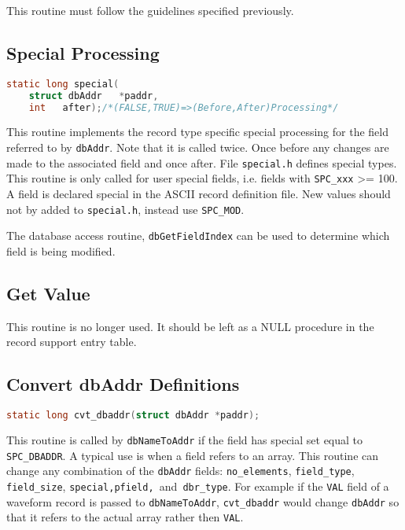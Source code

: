 This routine must follow the guidelines specified previously.

\subsection{Special Processing}

\begin{lstlisting}[language=C]
static long special(
    struct dbAddr   *paddr,
    int   after);/*(FALSE,TRUE)=>(Before,After)Processing*/
\end{lstlisting}

This routine implements the record type specific special processing for the field referred to by \verb|dbAddr|.
Note that it is called twice.
Once before any changes are made to the associated field and once after.
File \verb|special.h| defines special types.
This routine is only called for user special fields, i.e. fields with \verb|SPC_xxx| \textgreater{}= 100.
A field is declared special in the ASCII record definition file.
New values should not by added to \verb|special.h|, instead use \verb|SPC_MOD|.

The database access routine, \verb|dbGetFieldIndex| can be used to determine which field is being modified.

\subsection{Get Value}

This routine is no longer used.
It should be left as a NULL procedure in the record support entry table.

\subsection{Convert dbAddr Definitions}

\begin{lstlisting}[language=C]
static long cvt_dbaddr(struct dbAddr *paddr);
\end{lstlisting}

This routine is called by \verb|dbNameToAddr| if the field has special set equal to \verb|SPC_DBADDR|.
A typical use is when a field refers to an array.
This routine can change any combination of the \verb|dbAddr| fields:
\verb|no_elements|, \verb|field_type|, \verb|field_size|, \verb|special,pfield, |and\verb| dbr_type|.
For example if the \verb|VAL| field of a waveform record is passed to \verb|dbNameToAddr|, \verb|cvt_dbaddr| would change \verb|dbAddr| so that it refers to the actual array rather then \verb|VAL|.

